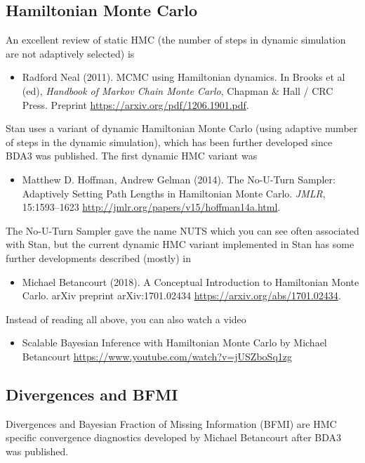 \documentclass[a4paper,11pt,english]{article}
\begin{document}
\subsection*{Hamiltonian Monte Carlo}

An excellent review of static HMC (the number of steps in dynamic
simulation are not adaptively selected) is
\begin{itemize}
\item Radford Neal (2011). MCMC using Hamiltonian dynamics. In Brooks
  et al (ed), {\em Handbook of Markov Chain Monte Carlo}, Chapman \&
  Hall / CRC Press. Preprint \url{https://arxiv.org/pdf/1206.1901.pdf}.
\end{itemize}

Stan uses a variant of dynamic Hamiltonian Monte Carlo (using adaptive
number of steps in the dynamic simulation), which has been further
developed since BDA3 was published. The first dynamic HMC variant was
\begin{itemize}
\item Matthew D. Hoffman, Andrew Gelman (2014). The No-U-Turn Sampler:
  Adaptively Setting Path Lengths in Hamiltonian Monte Carlo. {\em
    JMLR},
  15:1593--1623 \url{http://jmlr.org/papers/v15/hoffman14a.html}.
\end{itemize}
The No-U-Turn Sampler gave the name NUTS which you can see often
associated with Stan, but the current dynamic HMC variant implemented
in Stan has some further developments described (mostly) in
\begin{itemize}
\item Michael Betancourt (2018). A Conceptual Introduction to
  Hamiltonian Monte Carlo. arXiv preprint arXiv:1701.02434
  \url{https://arxiv.org/abs/1701.02434}.
\end{itemize}

Instead of reading all above, you can also watch a video
\begin{itemize}
\item Scalable Bayesian Inference with Hamiltonian Monte Carlo by
  Michael Betancourt
  \url{https://www.youtube.com/watch?v=jUSZboSq1zg}
\end{itemize}

\subsection*{Divergences and BFMI}

Divergences and Bayesian Fraction of Missing Information (BFMI) are
HMC specific convergence diagnostics developed by Michael Betancourt
after BDA3 was published.
\end{document}
